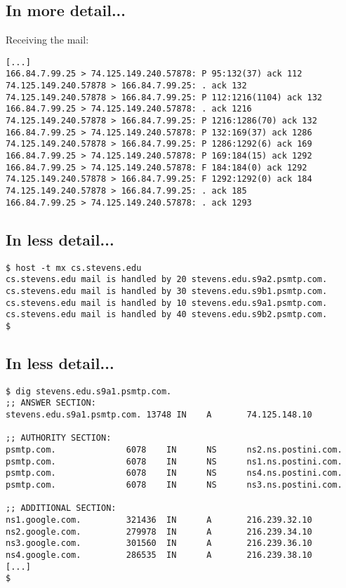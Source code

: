\documentclass[xga]{xdvislides}
\begin{document}
\subsection{In more detail...}
Receiving the mail:
\begin{verbatim}
[...]
166.84.7.99.25 > 74.125.149.240.57878: P 95:132(37) ack 112
74.125.149.240.57878 > 166.84.7.99.25: . ack 132
74.125.149.240.57878 > 166.84.7.99.25: P 112:1216(1104) ack 132
166.84.7.99.25 > 74.125.149.240.57878: . ack 1216
74.125.149.240.57878 > 166.84.7.99.25: P 1216:1286(70) ack 132
166.84.7.99.25 > 74.125.149.240.57878: P 132:169(37) ack 1286
74.125.149.240.57878 > 166.84.7.99.25: P 1286:1292(6) ack 169
166.84.7.99.25 > 74.125.149.240.57878: P 169:184(15) ack 1292
166.84.7.99.25 > 74.125.149.240.57878: F 184:184(0) ack 1292
74.125.149.240.57878 > 166.84.7.99.25: F 1292:1292(0) ack 184
74.125.149.240.57878 > 166.84.7.99.25: . ack 185
166.84.7.99.25 > 74.125.149.240.57878: . ack 1293
\end{verbatim}
\Normalsize

\subsection{In less detail...}
\newcommand{\smallish}{\fontsize{16}{16}\selectfont}
\begin{verbatim}
$ host -t mx cs.stevens.edu
cs.stevens.edu mail is handled by 20 stevens.edu.s9a2.psmtp.com.
cs.stevens.edu mail is handled by 30 stevens.edu.s9b1.psmtp.com.
cs.stevens.edu mail is handled by 10 stevens.edu.s9a1.psmtp.com.
cs.stevens.edu mail is handled by 40 stevens.edu.s9b2.psmtp.com.
$
\end{verbatim}
\Normalsize

\subsection{In less detail...}
\begin{verbatim}
$ dig stevens.edu.s9a1.psmtp.com.
;; ANSWER SECTION:
stevens.edu.s9a1.psmtp.com. 13748 IN    A       74.125.148.10

;; AUTHORITY SECTION:
psmtp.com.              6078    IN      NS      ns2.ns.postini.com.
psmtp.com.              6078    IN      NS      ns1.ns.postini.com.
psmtp.com.              6078    IN      NS      ns4.ns.postini.com.
psmtp.com.              6078    IN      NS      ns3.ns.postini.com.

;; ADDITIONAL SECTION:
ns1.google.com.         321436  IN      A       216.239.32.10
ns2.google.com.         279978  IN      A       216.239.34.10
ns3.google.com.         301560  IN      A       216.239.36.10
ns4.google.com.         286535  IN      A       216.239.38.10
[...]
$
\end{verbatim}
\end{document}
